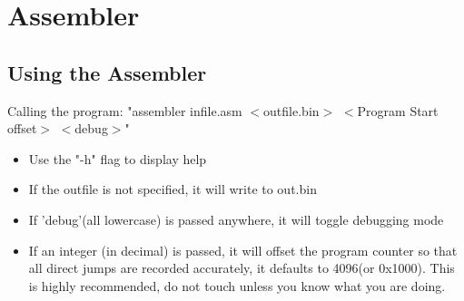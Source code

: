 \section{Assembler}
	\subsection{Using the Assembler}
		Calling the program: "assembler infile.asm $<$outfile.bin$>$ $<$Program Start offset$>$ $<$debug$>$"
		\begin{itemize}
			\item Use the "-h" flag to display help
			\item If the outfile is not specified, it will write to out.bin
			\item If 'debug'(all lowercase) is passed anywhere, it will toggle debugging mode
			\item If an integer (in decimal) is passed, it will offset the program counter so that all direct jumps are recorded accurately, it defaults to 4096(or 0x1000).  This is highly recommended, do not touch unless you know what you are doing.
		\end{itemize}
